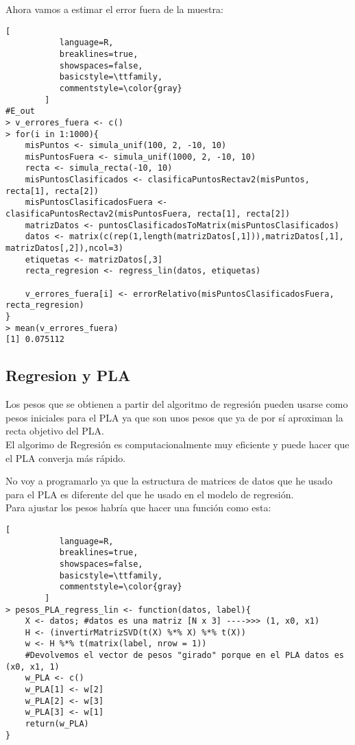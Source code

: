 \documentclass[11pt,fleqn]{book} %
\begin{document}
Ahora vamos a estimar el error fuera de la muestra:
\begin{lstlisting}[
           language=R,
           breaklines=true,
           showspaces=false,
           basicstyle=\ttfamily,
           commentstyle=\color{gray}
        ]    
#E_out
> v_errores_fuera <- c()
> for(i in 1:1000){
    misPuntos <- simula_unif(100, 2, -10, 10)
    misPuntosFuera <- simula_unif(1000, 2, -10, 10)
    recta <- simula_recta(-10, 10)
    misPuntosClasificados <- clasificaPuntosRectav2(misPuntos, recta[1], recta[2])
    misPuntosClasificadosFuera <- clasificaPuntosRectav2(misPuntosFuera, recta[1], recta[2])
    matrizDatos <- puntosClasificadosToMatrix(misPuntosClasificados)
    datos <- matrix(c(rep(1,length(matrizDatos[,1])),matrizDatos[,1], matrizDatos[,2]),ncol=3)
    etiquetas <- matrizDatos[,3]
    recta_regresion <- regress_lin(datos, etiquetas)
    
    v_errores_fuera[i] <- errorRelativo(misPuntosClasificadosFuera, recta_regresion)
}
> mean(v_errores_fuera)
[1] 0.075112
\end{lstlisting}

\subsection{Regresion y PLA}

Los pesos que se obtienen a partir del algoritmo de regresión pueden usarse como pesos iniciales para el PLA ya que son unos pesos que ya de por sí aproximan la recta objetivo del PLA.\\
El algorimo de Regresión es computacionalmente muy eficiente y puede hacer que el PLA converja más rápido.

No voy a programarlo ya que la estructura de matrices de datos que he usado para el PLA es diferente del que he usado en el modelo de regresión.\\

Para ajustar los pesos habría que hacer una función como esta:
\begin{lstlisting}[
           language=R,
           breaklines=true,
           showspaces=false,
           basicstyle=\ttfamily,
           commentstyle=\color{gray}
        ]    
> pesos_PLA_regress_lin <- function(datos, label){
    X <- datos; #datos es una matriz [N x 3] ---->>> (1, x0, x1)
    H <- (invertirMatrizSVD(t(X) %*% X) %*% t(X))
    w <- H %*% t(matrix(label, nrow = 1))
    #Devolvemos el vector de pesos "girado" porque en el PLA datos es (x0, x1, 1)
    w_PLA <- c()
    w_PLA[1] <- w[2]
    w_PLA[2] <- w[3]
    w_PLA[3] <- w[1]
    return(w_PLA)
}
\end{lstlisting}
\end{document}
